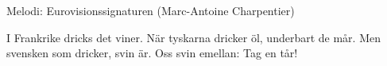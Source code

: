 \begin{song}

\begin{songmeta}
Melodi: Eurovisionssignaturen (Marc-Antoine Charpentier)
\end{songmeta}

\begin{songtext}
I Frankrike dricks det viner.
När tyskarna dricker öl, underbart de mår.
Men svensken som dricker, svin är.
Oss svin emellan: Tag en tår!
\end{songtext}
\end{song}
